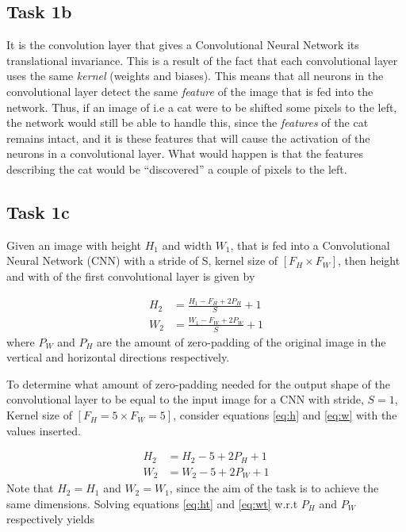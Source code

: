 \documentclass{article}
\begin{document}
\subsection{Task 1b}

It is the convolution layer that gives a Convolutional Neural Network its translational invariance. This is a result of the fact that each convolutional layer uses the same \textit{kernel} (weights and biases). This means that all neurons in the convolutional layer detect the same \textit{feature} of the image that is fed into the network. Thus, if an image of i.e a cat were to be shifted some pixels to the left, the network would still be able to handle this, since the \textit{features} of the cat remains intact, and it is these features that will cause the activation of the neurons in a convolutional layer. What would happen is that the features describing the cat would be ``discovered'' a couple of pixels to the left. 


\subsection{Task 1c}

Given an image with height $H_1$ and width $W_1$, that is fed into a Convolutional Neural Network (CNN) with a stride of S, kernel size of $[F_H\times F_W]$, then height and with of the first convolutional layer is given by

\begin{align}
    H_2 &= \frac{H_1 - F_H + 2P_H}{S} + 1 \label{eq:h}\\ 
    W_2 &= \frac{W_1 - F_W + 2P_W}{S} + 1 \label{eq:w}
\end{align}
where $P_W$ and $P_H$ are the amount of zero-padding of the original image in the vertical and horizontal directions respectively.  

To determine what amount of zero-padding needed for the output shape of the convolutional layer to be equal to the input image for a CNN with stride, $S=1$, Kernel size of $[F_H = 5 \times F_W = 5]$, consider equations \eqref{eq:h} and \eqref{eq:w} with the values inserted.

\begin{align}
    H_2 &= H_2 - 5 + 2P_H + 1 \label{eq:ht}\\ 
    W_2 &= W_2 - 5 + 2P_W + 1 \label{eq:wt}
\end{align}
Note that $H_2 = H_1$ and $W_2 = W_1$, since the aim of the task is to achieve the same dimensions. Solving equations \eqref{eq:ht} and \eqref{eq:wt} w.r.t $P_H$ and $P_W$ respectively yields
\end{document}
